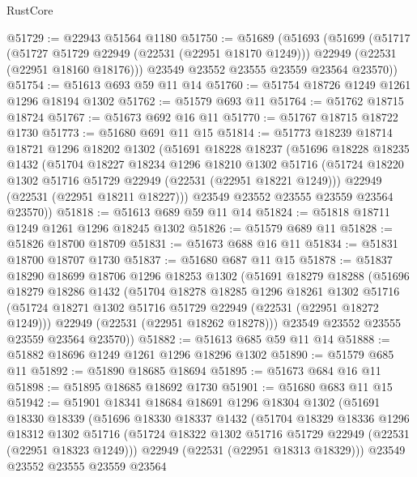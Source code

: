 \begin{lexlean}{RustCore}
\begin{coremodule}
@51729 := @22943 @51564 @1180
@51750 := @51689
    (@51693
      (@51699
        (@51717
          (@51727 @51729 @22949 (@22531 (@22951 @18170 @1249)))
          @22949
          (@22531 (@22951 @18160 @18176)))
        @23549
        @23552
        @23555
        @23559
        @23564
        @23570))
@51754 := @51613 @693 @59 @11 @14
@51760 := @51754 @18726 @1249 @1261 @1296 @18194 @1302
@51762 := @51579 @693 @11
@51764 := @51762 @18715 @18724
@51767 := @51673 @692 @16 @11
@51770 := @51767 @18715 @18722 @1730
@51773 := @51680 @691 @11 @15
@51814 := @51773
    @18239
    @18714
    @18721
    @1296
    @18202
    @1302
    (@51691
      @18228
      @18237
      (@51696
        @18228
        @18235
        @1432
        (@51704
          @18227
          @18234
          @1296
          @18210
          @1302
          @51716
          (@51724 @18220 @1302 @51716 @51729 @22949 (@22531 (@22951 @18221 @1249)))
          @22949
          (@22531 (@22951 @18211 @18227)))
        @23549
        @23552
        @23555
        @23559
        @23564
        @23570))
@51818 := @51613 @689 @59 @11 @14
@51824 := @51818 @18711 @1249 @1261 @1296 @18245 @1302
@51826 := @51579 @689 @11
@51828 := @51826 @18700 @18709
@51831 := @51673 @688 @16 @11
@51834 := @51831 @18700 @18707 @1730
@51837 := @51680 @687 @11 @15
@51878 := @51837
    @18290
    @18699
    @18706
    @1296
    @18253
    @1302
    (@51691
      @18279
      @18288
      (@51696
        @18279
        @18286
        @1432
        (@51704
          @18278
          @18285
          @1296
          @18261
          @1302
          @51716
          (@51724 @18271 @1302 @51716 @51729 @22949 (@22531 (@22951 @18272 @1249)))
          @22949
          (@22531 (@22951 @18262 @18278)))
        @23549
        @23552
        @23555
        @23559
        @23564
        @23570))
@51882 := @51613 @685 @59 @11 @14
@51888 := @51882 @18696 @1249 @1261 @1296 @18296 @1302
@51890 := @51579 @685 @11
@51892 := @51890 @18685 @18694
@51895 := @51673 @684 @16 @11
@51898 := @51895 @18685 @18692 @1730
@51901 := @51680 @683 @11 @15
@51942 := @51901
    @18341
    @18684
    @18691
    @1296
    @18304
    @1302
    (@51691
      @18330
      @18339
      (@51696
        @18330
        @18337
        @1432
        (@51704
          @18329
          @18336
          @1296
          @18312
          @1302
          @51716
          (@51724 @18322 @1302 @51716 @51729 @22949 (@22531 (@22951 @18323 @1249)))
          @22949
          (@22531 (@22951 @18313 @18329)))
        @23549
        @23552
        @23555
        @23559
        @23564

\end{coremodule}
\end{lexlean}
